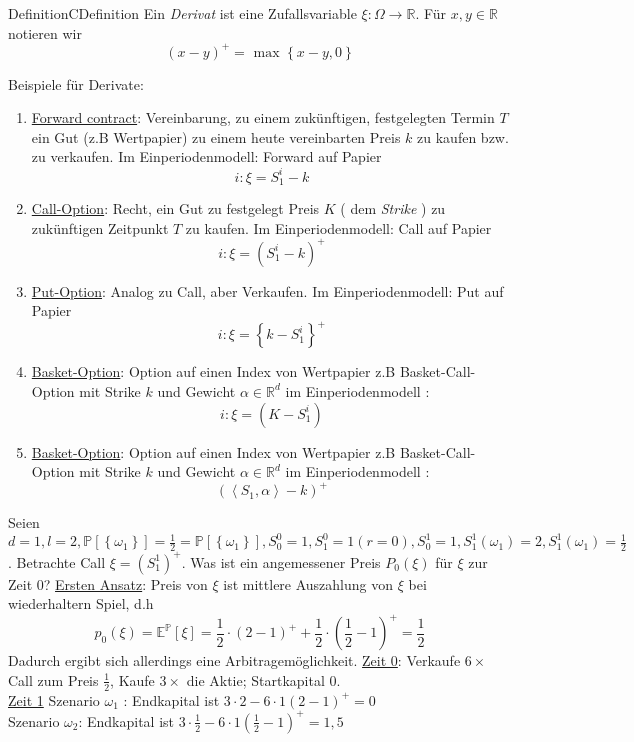 \documentclass[11.5 pt, a4paper]{memoir}
\begin{document}
\begin{ibox}[3.1]{Definition}{CDefinition}
    Ein \textit{Derivat} ist eine Zufallsvariable $ \xi : \Omega \to \mathbb{R} $. Für $ x, y \in \mathbb{R} $ notieren wir 
		$$ \left( x - y \right)^{+} = \text{ max } \left\{ x - y, 0 \right\}  $$
\end{ibox}

Beispiele für Derivate:                                                                                              
\begin{enumerate}[label=\alph*)]
	\item \underline{Forward contract}: Vereinbarung, zu einem zukünftigen, festgelegten Termin $ T $ ein Gut (z.B Wertpapier) zu einem heute vereinbarten Preis $ k $ zu kaufen bzw. zu verkaufen. Im Einperiodenmodell: Forward auf Papier
		$$ i: \xi = S_1^{i} - k  $$
	\item \underline{Call-Option}: Recht, ein Gut zu festgelegt Preis $ K $ ( dem \textit{Strike} ) zu zukünftigen Zeitpunkt $T$ zu kaufen.
		Im Einperiodenmodell: Call auf Papier 
		$$ i : \xi = \left( S_1^{i} - k \right) ^{+} $$
	\item \underline{Put-Option}: Analog zu Call, aber Verkaufen. Im Einperiodenmodell: Put auf Papier
		$$ i : \xi = \left\{ k - S_1^{i} \right\} ^{+} $$
	\item \underline{Basket-Option}: Option auf einen Index von Wertpapier z.B Basket-Call-Option mit Strike $ k $ und Gewicht
		$ \alpha \in \mathbb{R}^{d} $ im Einperiodenmodell :
		$$ i : \xi = \left( K - S_1^{i} \right)  $$
	\item \underline{Basket-Option}: Option auf einen Index von Wertpapier z.B Basket-Call-Option mit Strike $ k $ und Gewicht $ \alpha
		\in \mathbb{R}^{d}$ im Einperiodenmodell :
		$$ \left(  \left< S_1, \alpha \right> - k \right) ^{+} $$
\end{enumerate}
Seien $ d = 1, l =2, \mathbb{P} \left[ \left\{ \omega_1 \right\}  \right] = \frac{1}{2} = \mathbb{P} \left[ \left\{ \omega_1 \right\}  \right] , S_0^{0} = 1, S_1^{0} = 1 (r=0), S_0^{1} = 1, S_1^{1}\left( \omega_1 \right) = 2, S_1^{1} (\omega_1) = \frac{1}{2}  $.
Betrachte Call $ \xi = \left( S_1^{1} \right)^{+} $. Was ist ein angemessener Preis $ P_0 (\xi) $ für $ \xi $ zur Zeit 0? \break
\underline{Ersten Ansatz}: Preis von $ \xi $ ist mittlere Auszahlung von $ \xi $ bei wiederhaltern Spiel, d.h 
$$ p_0 (\xi) = \mathbb{E} ^{ \mathbb{P} } \left[ \xi \right] = \frac{1}{2} \cdot \left( 2 - 1 \right)^{+} + \frac{1}{2} \cdot 
\left( \frac{1}{2} -1 \right)^{+} = \frac{1}{2}  $$
Dadurch ergibt sich allerdings eine Arbitragemöglichkeit.
\break 
\underline{Zeit 0}: Verkaufe $ 6 \times $ Call zum Preis $ \frac{1}{2}  $, Kaufe $ 3 \times $ die Aktie; Startkapital 0. \\
\underline{Zeit 1} Szenario $ \omega_1 $ : Endkapital ist $ 3 \cdot 2 - 6 \cdot 1 (2-1)^{+} = 0 $ \\
Szenario $ \omega_2 $: Endkapital ist $ 3 \cdot \frac{1}{2} - 6 \cdot 1 \left( \frac{1}{2} - 1 \right) ^{+} = 1,5 $ 
\break
\end{document}
